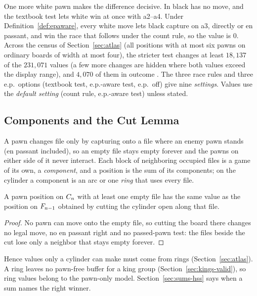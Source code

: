 One more white pawn makes the difference decisive. In  black has no move, and the textbook
test lets white win at once with a2--a4. Under Definition~\ref{def:epaware}, every white move lets black capture
on a3, directly or en passant, and win the race that follows under the count rule, so the value is $0$. Across
the census of Section~\ref{sec:atlas} (all positions with at most six pawns on ordinary boards of width at
most four), the stricter test changes at least $18{,}137$ of the $231{,}071$ values (a few more changes are hidden
where both values exceed the display range), and $4{,}070$ of them in outcome . The three race rules and three e.p.\ options (textbook test, e.p.-aware test, e.p.\ off) give nine
\emph{settings}. Values use the \emph{default setting} (count rule, e.p.-aware test) unless
stated.

\subsection{Components and the Cut Lemma}
A pawn changes file only by capturing onto a file where an enemy pawn stands (en passant included), so an empty
file stays empty forever and the pawns on either side of it never interact. Each block of neighboring occupied
files is a game of its own, a \emph{component}, and a position is the sum of its components; on the cylinder a
component is an arc or one \emph{ring} that uses every file.

\begin{theorem}\label{thm:cut}
A pawn position on $C_{n}$ with at least one empty file has the same value as the position on
$F_{n-1}$ obtained by cutting the cylinder open along that file.
\end{theorem}

\begin{proof}
No pawn can move onto the empty file, so cutting the board there changes no legal move, no en passant right and
no passed-pawn test: the files beside the cut lose only a neighbor that stays empty forever.
\end{proof}

Hence values only a cylinder can make must come from rings (Section~\ref{sec:atlas}). A ring leaves no
pawn-free buffer for a king group (Section~\ref{sec:kings-valid}), so ring values belong to the pawn-only model.
Section~\ref{sec:sums-hss} says when a sum names the right winner.
